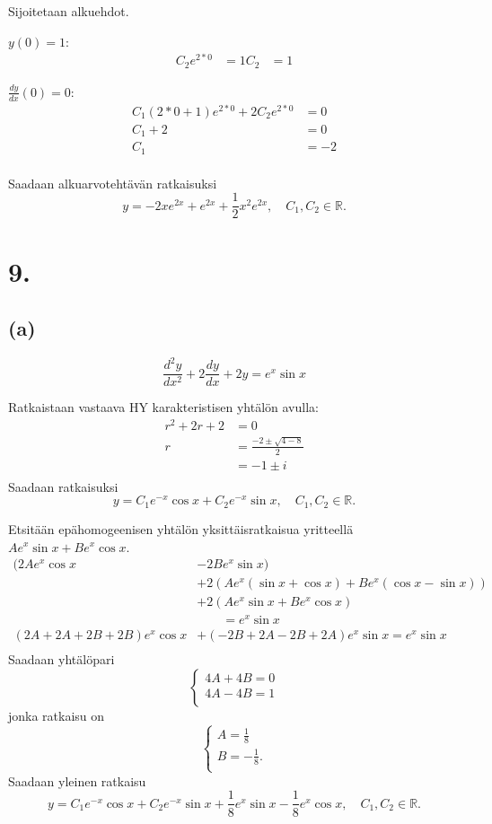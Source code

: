 \documentclass{article}
\begin{document}
Sijoitetaan alkuehdot.

$y(0) = 1$:
\begin{align*}
  C_2e^{2*0} &= 1
  C_2 &= 1
\end{align*}

$\frac{dy}{dx}(0) = 0$:
\begin{align*}
  C_1(2*0 + 1)e^{2*0} + 2C_2e^{2*0} &= 0 \\
  C_1 + 2 &= 0 \\
  C_1 &= -2 \\
\end{align*}

Saadaan alkuarvotehtävän ratkaisuksi
\[
  y = -2xe^{2x} + e^{2x} + \frac{1}{2}x^2e^{2x}, \quad C_1,C_2 \in \mathbb{R}.
\]

\section*{9.}

\subsection*{(a)}

\[
  \frac{d^2 y}{d x^2} + 2\frac{dy}{dx} + 2y = e^x\sin x
\]

Ratkaistaan vastaava HY karakteristisen yhtälön avulla:
\begin{align*}
  r^2 + 2r + 2 &= 0 \\
  r &= \frac{-2 \pm \sqrt{4 - 8}}{2} \\
    &= -1 \pm i \\
\end{align*}
Saadaan ratkaisuksi
\[
  y = C_1e^{-x}\cos x + C_2e^{-x}\sin x, \quad C_1,C_2 \in \mathbb{R}.
\]

Etsitään epähomogeenisen yhtälön yksittäisratkaisua yritteellä
$Ae^x\sin x + Be^x\cos x$.
\begin{align*}
  (2Ae^x\cos x &- 2Be^x\sin x) \\
      &+ 2(Ae^x(\sin x + \cos x) + Be^x(\cos x - \sin x)) \\
      &+ 2(Ae^x\sin x + Be^x \cos x) \\
      &\qquad= e^x\sin x \\
  (2A + 2A + 2B + 2B)e^x\cos x &+ (-2B + 2A - 2B + 2A)e^x\sin x = e^x\sin x \\
\end{align*}
Saadaan yhtälöpari
\[
  \begin{cases}
    4A + 4B = 0 \\
    4A - 4B = 1 \\
  \end{cases}
\]
jonka ratkaisu on
\[
  \begin{cases}
    A = \frac{1}{8} \\
    B = -\frac{1}{8}. \\
  \end{cases}
\]
Saadaan yleinen ratkaisu
\[
  y = C_1e^{-x}\cos x + C_2e^{-x}\sin x + \frac{1}{8}e^x\sin x - \frac{1}{8}e^x\cos x, \quad C_1,C_2 \in \mathbb{R}.
\]
\end{document}
